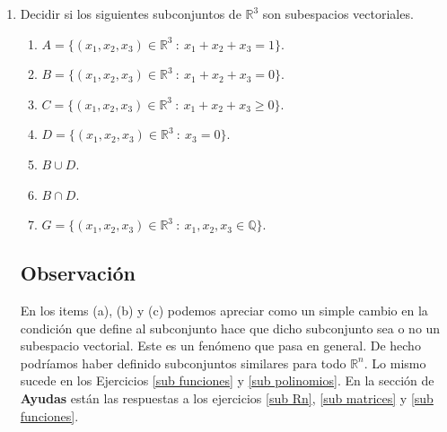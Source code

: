 \documentclass[12pt]{amsart}
\begin{document}
\begin{enumerate}

	


\item\label{sub Rn} Decidir si los siguientes subconjuntos de $\mathbb{R}^3$ son subespacios vectoriales.


	\begin{enumerate}
		\item\label{sub Rn 1} $A=\{(x_1, x_2 ,x_3) \in \mathbb{R}^3 \ : \ x_1 + x_2 + x_3=1\}$.
		\item\label{sub Rn 0} $B=\{(x_1, x_2 ,x_3) \in \mathbb{R}^3 \ : \ x_1 + x_2 + x_3=0\}$.
		\item\label{sub Rn geq} $C=\{(x_1, x_2 ,x_3) \in \mathbb{R}^3 \ : \ x_1 + x_2 + x_3 \geq 0\}$.
		\item\label{sub Rn 1 30} $D=\{(x_1, x_2 ,x_3) \in \mathbb{R}^3 \ : \ x_3=0\}$.
		\item\label{sub Rn cup} $B\cup D$.
		\item\label{sub Rn cap} $B\cap D$.
		\item\label{sub Rn q} $G=\{(x_1, x_2 ,x_3) \in \mathbb{R}^3 \ :\ x_1, x_2, x_3\in\mathbb{Q}\}$.
	\end{enumerate}
	
\subsection*{Observaci\'on} En los items (a), (b) y (c) podemos apreciar como un simple cambio en la condici\'on que define al subconjunto hace que dicho subconjunto sea o no un \linebreak subespacio vectorial. Este es un fen\'omeno que pasa en general. De hecho podr\'iamos haber definido subconjuntos similares para todo $\mathbb{R}^n$. Lo mismo sucede en los Ejercicios \eqref{sub funciones} y \eqref{sub polinomios}.
En la secci\'on de {\bf Ayudas} est\'an las respuestas a los ejercicios \eqref{sub Rn}, \eqref{sub matrices} y \eqref{sub funciones}.
		

\end{enumerate}
\end{document}
